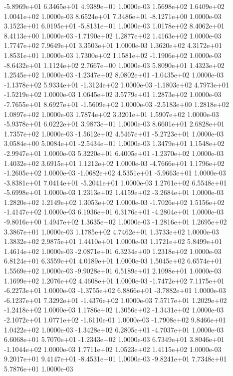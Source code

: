 -5.8969e+01  6.3465e+01  4.9389e+01  1.0000e-03
1.5698e+02 1.6409e+02 1.0041e+02  1.0000e-03
 8.6524e+01  7.3486e+01 -8.1271e+00  1.0000e-03
 3.1523e+01  6.0195e+01 -5.8131e+01  1.0000e-03
1.0178e+02 8.4062e+01 8.4113e+00  1.0000e-03
-1.7190e+02  1.2877e+02  1.4163e+02  1.0000e-03
1.7747e+02 7.9649e+01 3.3503e+01  1.0000e-03
1.3620e+02 4.3172e+01 1.8531e+01  1.0000e-03
 1.7300e+02  1.1581e+02 -1.1906e+02  1.0000e-03
-8.6432e+01  1.1124e+02  2.7667e+00  1.0000e-03
5.8090e+01 1.4323e+02 1.2545e+02  1.0000e-03
-1.2347e+02  8.0802e+01 -1.0435e+02  1.0000e-03
-1.1378e+02  5.9334e+01 -1.3124e+02  1.0000e-03
-1.1803e+02  4.7973e+01 -1.5219e+02  1.0000e-03
1.0645e+02 3.5779e+01 1.2873e+02  1.0000e-03
-7.7655e+01  8.6927e+01 -1.5609e+02  1.0000e-03
-2.5183e+00  1.2818e+02  1.0897e+02  1.0000e-03
1.7874e+02 3.3201e+01 1.5907e+02  1.0000e-03
-5.9378e+01  6.0222e+01  3.9873e+01  1.0000e-03
8.6601e+01 2.6828e+01 1.7357e+02  1.0000e-03
-1.5612e+02  4.5467e+01 -5.2723e+01  1.0000e-03
 3.0584e+00  5.0084e+01 -2.5434e+01  1.0000e-03
 1.3479e+01  1.1548e+02 -2.9947e+01  1.0000e-03
 5.3220e+01  6.4005e+01 -1.2370e+02  1.0000e-03
1.4032e+02 3.6915e+01 1.1212e+02  1.0000e-03
-4.7666e+01  1.1796e+02 -1.2605e+02  1.0000e-03
-1.0682e+02  4.5351e+01 -5.9663e+01  1.0000e-03
-3.8381e+01  7.0414e+01 -5.2041e+01  1.0000e-03
 1.2761e+02  6.5548e+01 -5.6998e+01  1.0000e-03
 1.2313e+02  1.4159e+02 -3.2684e+01  1.0000e-03
1.2820e+02 1.2149e+02 1.3053e+02  1.0000e-03
-1.7026e+02  1.5156e+02 -1.4147e+02  1.0000e-03
 6.1936e+01  6.3176e+01 -4.2804e+01  1.0000e-03
-9.8016e+00  1.4947e+02  1.3635e+02  1.0000e-03
-1.2816e+01  1.2695e+02  3.3867e+01  1.0000e-03
1.1785e+02 4.7462e+01 1.3733e+02  1.0000e-03
1.3832e+02 2.9875e+01 1.4410e+01  1.0000e-03
1.1721e+02 5.8499e+01 1.4614e+02  1.0000e-03
-2.0871e+01  6.3234e+00  1.2318e+02  1.0000e-03
6.8124e+01 6.3559e+01 4.0189e+01  1.0000e-03
1.5045e+02 6.6574e+01 1.5569e+02  1.0000e-03
-9.9028e+01  6.5189e+01  2.1098e+01  1.0000e-03
1.1699e+02 1.2076e+02 4.4608e+01  1.0000e-03
-1.7472e+02  7.1175e+01 -6.2273e+01  1.0000e-03
-1.3755e+02  6.8866e+01 -3.7882e+01  1.0000e-03
-6.1237e+01  7.3292e+01 -1.4376e+02  1.0000e-03
 7.5717e+01  1.2029e+02 -1.2418e+02  1.0000e-03
 1.1786e+02  1.3056e+02 -1.3431e+02  1.0000e-03
-2.1072e+01  1.0771e+02 -1.6110e-01  1.0000e-03
-1.7908e+02  9.8466e+01  1.0422e+02  1.0000e-03
-1.3428e+02  6.2805e+01 -4.7037e+01  1.0000e-03
 6.6068e+01  5.7070e+01 -1.2343e+02  1.0000e-03
 6.7349e+01  3.8046e+01 -1.1044e+02  1.0000e-03
1.7711e+02 1.0523e+02 1.4115e+02  1.0000e-03
 9.2017e+01  9.4147e+01 -8.4531e+01  1.0000e-03
-9.8241e+01  7.7348e+01  5.7876e+01  1.0000e-03

